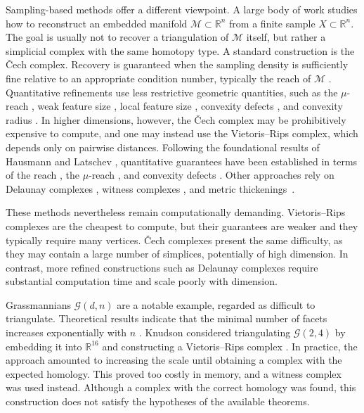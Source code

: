 \documentclass[a4paper,english,cleveref,autoref,thm-restate,nolineno]{socg-lipics-v2021}
\newcommand{\R}{\mathbb R}
\newcommand{\GG}{\mathcal G} %
\begin{document}
Sampling-based methods offer a different viewpoint.
A large body of work studies how to reconstruct an embedded manifold $\mathcal{M} \subset\R^n$ from a finite sample $X \subset\R^n$.
The goal is usually not to recover a triangulation of $\mathcal{M}$ itself, but rather a simplicial complex with the same homotopy type.
A standard construction is the \v{C}ech complex.
Recovery is guaranteed when the sampling density is sufficiently fine relative to an appropriate condition number, typically the reach of $\mathcal{M}$ \cite{niyogi2008finding}.
Quantitative refinements use less restrictive geometric quantities, such as the $\mu$-reach \cite{chazal2006sampling,kim_et_al:LIPIcs.SoCG.2020.54}, weak feature size \cite{chazal2007stability}, local feature size \cite{chazal2008smooth}, convexity defects \cite{attali2011vietoris}, and convexity radius \cite{fasy2022reconstruction}.
In higher dimensions, however, the \v{C}ech complex may be prohibitively expensive to compute, and one may instead use the Vietoris--Rips complex, which depends only on pairwise distances.
Following the foundational results of Hausmann and Latschev \cite{hausmann1995vietoris,latschev2001vietoris}, quantitative guarantees have been established in terms of the reach \cite{majhi:LIPIcs.SoCG.2024.73,majhi2025demystifying}, the $\mu$-reach \cite{kim_et_al:LIPIcs.SoCG.2020.54}, and convexity defects \cite{attali2011vietoris}.
Other approaches rely on Delaunay complexes \cite{10.1145/1810959.1811013,boissonnat2010manifold,boissonnat2018delaunay,aamari2018stability}, witness complexes \cite{10.2312:SPBG/SPBG04/157-166,guibas2008reconstruction,boissonnat2007manifold,Boissonnat2009}, and metric thickenings~\cite{adamaszek2018metric,adams2019metric}.

These methods nevertheless remain computationally demanding. 
Vietoris--Rips complexes are the cheapest to compute, but their guarantees are weaker and they typically require many vertices.
\v{C}ech complexes present the same difficulty, as they may contain a large number of simplices, potentially of high dimension. 
In contrast, more refined constructions such as Delaunay complexes require substantial computation time and scale poorly with dimension.

Grassmannians $\GG(d,n)$ are a notable example, regarded as difficult to triangulate.
Theoretical results indicate that the minimal number of facets increases exponentially with $n$ \cite{GovcMarzantowiczPavesic2020}.
Knudson considered triangulating $\GG(2,4)$ by embedding it into $\R^{16}$ and constructing a Vietoris--Rips complex \cite{Knudson2020}.
In practice, the approach amounted to increasing the scale until obtaining a complex with the expected homology.
This proved too costly in memory, and a witness complex was used instead.
Although a complex with the correct homology was found, this construction does not satisfy the hypotheses of the available theorems. 
\end{document}
